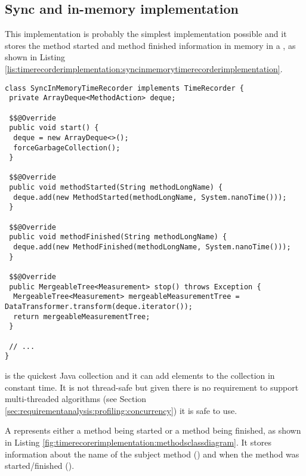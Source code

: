 \subsection{Sync and in-memory implementation}
\label{sec:implementation:timerecorderimplementation:syncinmemory} 
This implementation is probably the simplest implementation possible and it stores the method started and method finished information in memory in a , as shown in Listing \ref{lis:timerecorderimplementation:syncinmemorytimerecorderimplementation}.

\noindent\begin{minipage}[c]{\linewidth}
\begin{lstlisting}[breaklines,caption={Sync and in-memory time recorder implementation},label=lis:timerecorderimplementation:syncinmemorytimerecorderimplementation]
class SyncInMemoryTimeRecorder implements TimeRecorder {
 private ArrayDeque<MethodAction> deque;

 $$@Override
 public void start() {
  deque = new ArrayDeque<>();
  forceGarbageCollection();
 }

 $$@Override
 public void methodStarted(String methodLongName) {
  deque.add(new MethodStarted(methodLongName, System.nanoTime()));
 }

 $$@Override
 public void methodFinished(String methodLongName) {
  deque.add(new MethodFinished(methodLongName, System.nanoTime()));
 }

 $$@Override
 public MergeableTree<Measurement> stop() throws Exception {
  MergeableTree<Measurement> mergeableMeasurementTree = DataTransformer.transform(deque.iterator());
  return mergeableMeasurementTree;
 }
 
 // ...
}
\end{lstlisting}
\end{minipage}

\noindent {} is the quickest Java collection and it can add elements to the collection in constant time. It is not thread-safe but given there is no requirement to support multi-threaded algorithms (see Section \ref{sec:requirementanalysis:profiling:concurrency}) it is safe to use.

\noindent A  represents either a method being started or a method being finished, as shown in Listing \ref{fig:timerecorerimplementation:methodsclassdiagram}. It stores information about the name of the subject method () and when the method was started/finished ().

